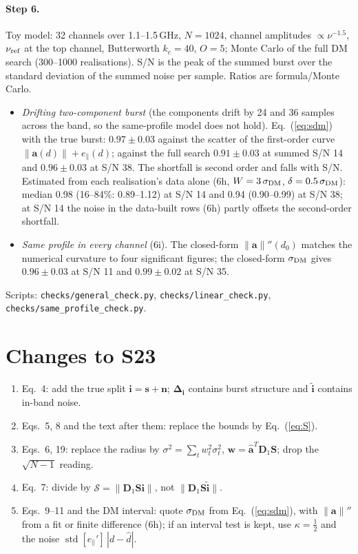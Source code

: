 \documentclass[11pt]{article}
\newcommand{\vb}[1]{\boldsymbol{#1}}
\newcommand{\Dn}{\vb D_1}
\newcommand{\Sm}{\vb S}
\newcommand{\ti}{\tilde{\vb i}}
\newcommand{\Di}{\vb\Delta_{\vb i}}
\newcommand{\ah}{\hat{\vb a}}
\newcommand{\nrm}[1]{\lVert #1\rVert}
\newcommand{\Sc}{\mathcal S}
\newcommand{\ep}{e_\parallel}
\newcommand{\std}{\operatorname{std}}
\begin{document}
\paragraph{Step 6.} Toy model: 32 channels over 1.1--1.5\,GHz, $N=1024$, channel amplitudes
$\propto\nu^{-1.5}$, $\nu_{\rm ref}$ at the top channel, Butterworth $k_c=40$, $O=5$; Monte Carlo of the full DM
search (300--1000 realisations). S/N is the peak of the summed burst over the standard deviation of the summed
noise per sample. Ratios are formula/Monte Carlo.
\begin{itemize}
\item \emph{Drifting two-component burst} (the components drift by 24 and 36 samples across the band, so the
same-profile model does not hold). Eq.~(\ref{eq:sdm}) with the true burst: $0.97\pm0.03$ against the scatter of the
first-order curve $\nrm{\vb a(d)}+\ep(d)$; against the full search $0.91\pm0.03$ at summed S/N 14 and
$0.96\pm0.03$ at S/N 38. The shortfall is second order and falls with S/N. Estimated from each realisation's
data alone (6h, $W=3\,\sigma_{\rm DM}$, $\delta=0.5\,\sigma_{\rm DM}$): median 0.98 (16--84\%: 0.89--1.12) at
S/N 14 and 0.94 (0.90--0.99) at S/N 38; at S/N 14 the noise in the data-built rows (6h) partly offsets the
second-order shortfall.
\item \emph{Same profile in every channel} (6i). The closed-form $\nrm{\vb a}''(d_0)$ matches the numerical
curvature to four significant figures; the closed-form $\sigma_{\rm DM}$ gives $0.96\pm0.03$ at S/N 11 and
$0.99\pm0.02$ at S/N 35.
\end{itemize}
Scripts: \texttt{checks/general\_check.py}, \texttt{checks/linear\_check.py}, \texttt{checks/same\_profile\_check.py}.

\section*{Changes to S23}
\begin{enumerate}
\item Eq.~4: add the true split $\vb i=\vb s+\vb n$; $\Di$ contains burst structure and $\ti$ contains in-band noise.
\item Eqs.~5, 8 and the text after them: replace the bounds by Eq.~(\ref{eq:S}).
\item Eqs.~6, 19: replace the radius by $\sigma^{2}=\sum_tw_t^{2}\sigma_t^{2}$, $\vb w=\ah^{T}\Dn\Sm$; drop the
$\sqrt{N-1}$ reading.
\item Eq.~7: divide by $\Sc=\nrm{\Dn\Sm\vb i}$, not $\nrm{\Dn\Sm\ti}$.
\item Eqs.~9--11 and the DM interval: quote $\sigma_{\rm DM}$ from Eq.~(\ref{eq:sdm}), with $\nrm{\vb a}''$ from a fit
or finite difference (6h); if an interval test is kept, use $\kappa=\tfrac12$ and the noise $\std[\ep']\,|d-\hat d|$.
\end{enumerate}
\end{document}
